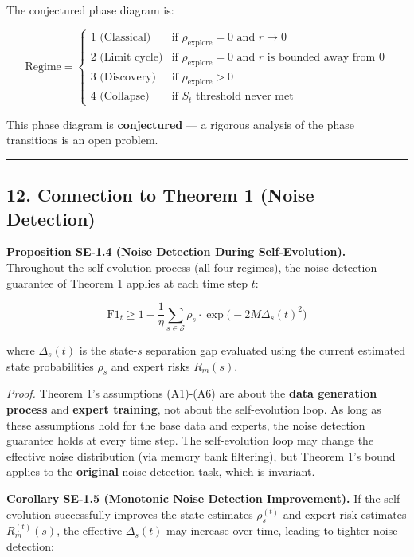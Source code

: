 \documentclass[
  12pt,
]{article}
\begin{document}
The conjectured phase diagram is:

\[
\text{Regime} = \begin{cases}
1 \text{ (Classical)} & \text{if } \rho_{\text{explore}} = 0 \text{ and } r \to 0 \\
2 \text{ (Limit cycle)} & \text{if } \rho_{\text{explore}} = 0 \text{ and } r \text{ is bounded away from } 0 \\
3 \text{ (Discovery)} & \text{if } \rho_{\text{explore}} > 0 \\
4 \text{ (Collapse)} & \text{if } S_t \text{ threshold never met}
\end{cases}
\]

This phase diagram is \textbf{conjectured} --- a rigorous analysis of
the phase transitions is an open problem.

\begin{center}\rule{0.5\linewidth}{0.5pt}\end{center}

\subsection{12. Connection to Theorem 1 (Noise
Detection)}\label{connection-to-theorem-1-noise-detection}

\textbf{Proposition SE-1.4 (Noise Detection During Self-Evolution).}
Throughout the self-evolution process (all four regimes), the noise
detection guarantee of Theorem 1 applies at each time step \(t\):

\[
\text{F1}_t \geq 1 - \frac{1}{\eta} \sum_{s \in \mathcal{S}} \rho_s \cdot \exp\!\bigl(-2M\Delta_s(t)^2\bigr)
\]

where \(\Delta_s(t)\) is the state-\(s\) separation gap evaluated using
the current estimated state probabilities \(\rho_s\) and expert risks
\(R_m(s)\).

\emph{Proof.} Theorem 1's assumptions (A1)-(A6) are about the
\textbf{data generation process} and \textbf{expert training}, not about
the self-evolution loop. As long as these assumptions hold for the base
data and experts, the noise detection guarantee holds at every time
step. The self-evolution loop may change the effective noise
distribution (via memory bank filtering), but Theorem 1's bound applies
to the \textbf{original} noise detection task, which is invariant.

\textbf{Corollary SE-1.5 (Monotonic Noise Detection Improvement).} If
the self-evolution successfully improves the state estimates
\(\rho_s^{(t)}\) and expert risk estimates \(R_m^{(t)}(s)\), the
effective \(\Delta_s(t)\) may increase over time, leading to tighter
noise detection:
\end{document}
